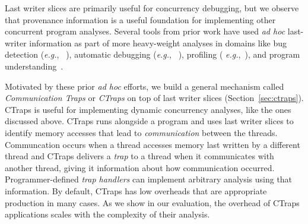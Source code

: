 \documentclass[preprint,10pt]{sigplanconf}
\newcommand{\ctraps}{CTraps\xspace}
\begin{document}


Last writer slices are primarily useful for concurrency debugging, but we 
observe that provenance information is a
useful foundation for implementing other concurrent program analyses.  Several
tools from prior work have used {\em ad hoc} last-writer information as part of
more heavy-weight analyses in domains like bug detection ({\em e.g.},
~\cite{dmtracker,avio}), automatic debugging ({\em e.g.},
~\cite{recon,conseq,cci}), profiling ({\em
e.g.},~\cite{threadclustering, schedpredictionmodel}), and program
understanding~\cite{oshatr}. 

Motivated by these prior {\em ad hoc} efforts, we build a general mechanism
called {\em Communication Traps} or {\em \ctraps} on top of last writer slices
(Section~\ref{sec:ctraps}). \ctraps is useful for implementing dynamic
concurrency analyses, like the ones discussed above.  \ctraps runs alongside a
program and uses last writer slices to identify memory accesses that lead to
{\em communication} between the threads. Communcation occurs when a thread
accesses memory last written by a different thread and \ctraps delivers a {\em
trap} to a thread when it communicates with another thread, giving it
information about how communication occurred.  Programmer-defined {\em trap
handlers} can implement arbitrary analysis using that information. By default,
\ctraps has low overheads that are appropriate production in many cases.  As we
show in our evaluation, the overhead of \ctraps applications scales with the
complexity of their analysis.
\end{document}
